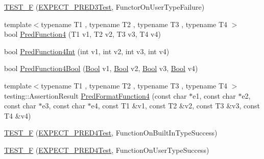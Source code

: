 \begin{DoxyCompactItemize}
\item 
\mbox{\hyperlink{_obj__test_2lib_2googletest-master_2googletest_2test_2gtest__pred__impl__unittest_8cc_a1d3e62b254c408b35bf05205699dca87}{T\+E\+S\+T\+\_\+F}} (\mbox{\hyperlink{googletest-master_2googletest_2test_2gtest__pred__impl__unittest_8cc_a15eb53ab3f302d7bfffe1352f3902eb4}{E\+X\+P\+E\+C\+T\+\_\+\+P\+R\+E\+D3\+Test}}, Functor\+On\+User\+Type\+Failure)
\item 
{\footnotesize template$<$typename T1 , typename T2 , typename T3 , typename T4 $>$ }\\bool \mbox{\hyperlink{_obj__test_2lib_2googletest-master_2googletest_2test_2gtest__pred__impl__unittest_8cc_a69db8bec40f25365dbd42dbe6c3319fe}{Pred\+Function4}} (T1 v1, T2 v2, T3 v3, T4 v4)
\item 
bool \mbox{\hyperlink{_obj__test_2lib_2googletest-master_2googletest_2test_2gtest__pred__impl__unittest_8cc_a105a045112a34fb2b65360c0d5daf81e}{Pred\+Function4\+Int}} (int v1, int v2, int v3, int v4)
\item 
bool \mbox{\hyperlink{_obj__test_2lib_2googletest-master_2googletest_2test_2gtest__pred__impl__unittest_8cc_a5d842d3bce2d16793299e77d1cb5c980}{Pred\+Function4\+Bool}} (\mbox{\hyperlink{struct_bool}{Bool}} v1, \mbox{\hyperlink{struct_bool}{Bool}} v2, \mbox{\hyperlink{struct_bool}{Bool}} v3, \mbox{\hyperlink{struct_bool}{Bool}} v4)
\item 
{\footnotesize template$<$typename T1 , typename T2 , typename T3 , typename T4 $>$ }\\testing\+::\+Assertion\+Result \mbox{\hyperlink{_obj__test_2lib_2googletest-master_2googletest_2test_2gtest__pred__impl__unittest_8cc_a9fbd4c3333dcc98c0cfee19ce28bc2b1}{Pred\+Format\+Function4}} (const char $\ast$e1, const char $\ast$e2, const char $\ast$e3, const char $\ast$e4, const T1 \&v1, const T2 \&v2, const T3 \&v3, const T4 \&v4)
\item 
\mbox{\hyperlink{_obj__test_2lib_2googletest-master_2googletest_2test_2gtest__pred__impl__unittest_8cc_a15e705507c885f4d89c6f9d9d1601c96}{T\+E\+S\+T\+\_\+F}} (\mbox{\hyperlink{googletest-master_2googletest_2test_2gtest__pred__impl__unittest_8cc_abbf7ac63ea663c0dec815df5770cd2a8}{E\+X\+P\+E\+C\+T\+\_\+\+P\+R\+E\+D4\+Test}}, Function\+On\+Built\+In\+Type\+Success)
\item 
\mbox{\hyperlink{_obj__test_2lib_2googletest-master_2googletest_2test_2gtest__pred__impl__unittest_8cc_a666c4a544439533ef0fbac4fad0b3cf4}{T\+E\+S\+T\+\_\+F}} (\mbox{\hyperlink{googletest-master_2googletest_2test_2gtest__pred__impl__unittest_8cc_abbf7ac63ea663c0dec815df5770cd2a8}{E\+X\+P\+E\+C\+T\+\_\+\+P\+R\+E\+D4\+Test}}, Function\+On\+User\+Type\+Success)

\end{DoxyCompactItemize}
